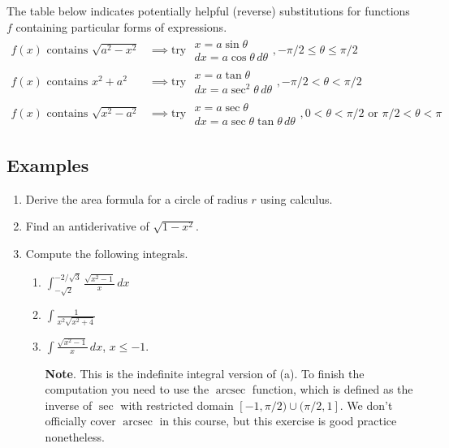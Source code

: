 \begin{namedtheorem}
The table below indicates potentially helpful (reverse) substitutions for functions $f$ containing particular forms of expressions.
\begin{align*}
  f(x) \text{ contains } \sqrt{a^2-x^2}&\implies \text{try } \begin{array}{c}
    x=a\sin\theta\\
    dx=a\cos\theta\, d\theta
  \end{array}, -\pi/2\leq\theta\leq\pi/2\\
  f(x) \text{ contains } x^2+a^2 &\implies \text{try } \begin{array}{c}
    x=a\tan\theta\\
    dx=a\sec^2\theta\, d\theta
  \end{array}, -\pi/2<\theta< \pi/2\\
  f(x) \text{ contains } \sqrt{x^2-a^2} &\implies \text{try } \begin{array}{c}
    x=a\sec\theta\\
    dx=a\sec\theta\tan\theta\, d\theta
  \end{array}, 0<\theta< \pi/2 \text{ or } \pi/2<\theta<\pi
\end{align*}

\end{namedtheorem}
\subsection*{Examples}

\begin{enumerate}
  \item Derive the area formula for a circle of radius $r$ using calculus.
  \item Find an antiderivative of $\sqrt{1-x^2}$.
  \item Compute the following integrals.
  \begin{enumerate}
    \item $\displaystyle\int_{-\sqrt{2}}^{-2/\sqrt{3}}\frac{\sqrt{x^2-1}}{x}\, dx$
    \item $\displaystyle\int \frac{1}{x^2\sqrt{x^2+4}}$
    \item $\displaystyle\int \frac{\sqrt{x^2-1}}{x}\, dx$, $x\leq -1$.

    {\bf Note}. This is the indefinite integral version of (a). To finish the computation you need to use the $\operatorname{arcsec}$ function, which is defined as the inverse of $\sec$ with restricted domain $[-1,\pi/2)\cup (\pi/2,1]$. We don't officially cover $\operatorname{arcsec}$ in this course, but this exercise is good practice nonetheless.
  \end{enumerate}
\end{enumerate}



